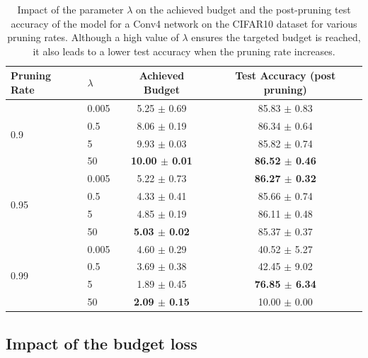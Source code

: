 \begin{table}[tbp]
  \centering
  \begin{center}
    \begin{tabular}{llcc}
      \toprule
      \textbf{Pruning Rate} & \textbf{$\lambda$} & \textbf{Achieved Budget} & \textbf{Test Accuracy (post pruning)} \\
      \midrule
      \multirow{4}{*}{0.9} & 0.005 & 5.25 $\pm$ 0.69 & 85.83 $\pm$ 0.83 \\
      & 0.5 & 8.06 $\pm$ 0.19 & 86.34 $\pm$ 0.64 \\
      & 5 & 9.93 $\pm$ 0.03 & 85.82 $\pm$ 0.74 \\
      & 50 & \textbf{10.00 $\pm$ 0.01} & \textbf{86.52 $\pm$ 0.46} \\
      \midrule
      \multirow{4}{*}{0.95} & 0.005 & 5.22 $\pm$ 0.73 & \textbf{86.27 $\pm$ 0.32} \\
      & 0.5 & 4.33 $\pm$ 0.41 & 85.66 $\pm$ 0.74 \\
      & 5 & 4.85 $\pm$ 0.19 & 86.11 $\pm$ 0.48 \\
      & 50 & \textbf{5.03 $\pm$ 0.02} & 85.37 $\pm$ 0.37 \\
      \midrule
      \multirow{4}{*}{0.99} & 0.005 & 4.60 $\pm$ 0.29 & 40.52 $\pm$ 5.27 \\
      & 0.5 & 3.69 $\pm$ 0.38 & 42.45 $\pm$ 9.02 \\
      & 5 & 1.89 $\pm$ 0.45 & \textbf{76.85 $\pm$ 6.34} \\
      & 50 & \textbf{2.09 $\pm$ 0.15} & 10.00 $\pm$ 0.00 \\
      \bottomrule
    \end{tabular}
  \end{center}
  \caption{
    Impact of the parameter $\lambda$ on the achieved budget and the post-pruning test accuracy of the model for a Conv4 network on the CIFAR10 dataset
    for various pruning rates. Although a high value of $\lambda$ ensures 
    the targeted budget is reached, it also leads to a lower test accuracy when
    the pruning rate increases.}
    \label{tab:chap1:lambda_impact}
\end{table}



\subsection{Impact of the budget loss}
\label{sec:chap1:impact_of_budget_loss}

